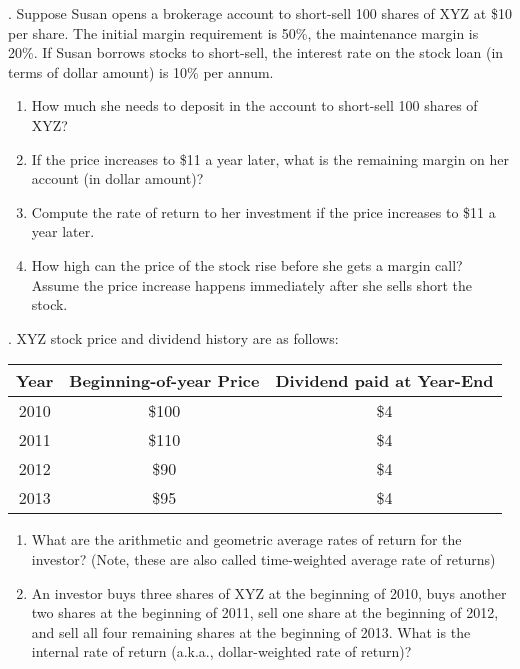\documentclass[11.5pt]{article}
\begin{document}
\newpage





. Suppose Susan opens a brokerage account to short-sell 100 shares of XYZ at \$10 per share.  The initial margin requirement is 50\%, the maintenance margin is 20\%.  If Susan borrows stocks to short-sell, the interest rate on the stock loan (in terms of dollar amount) is 10\% per annum.  


\begin{enumerate}
\item How much she needs to deposit in the account to short-sell 100 shares of XYZ?

\item If the price increases to \$11 a year later, what is the remaining margin on her account (in dollar amount)?

\item Compute the rate of return to her investment if the price increases to \$11 a year later.

\item How high can the price of the stock rise before she gets a margin call?  Assume the price increase happens immediately after she sells short the stock.

\end{enumerate}
	

\vspace{40pt}



. XYZ stock price and dividend history are as follows:

\begin{table}[h]
	\begin{tabular}{ccc}
		\hline
		Year & Beginning-of-year Price & Dividend paid at   Year-End \\ \hline
		2010 & \$100                   & \$4                         \\
		2011 & \$110                   & \$4                         \\
		2012 & \$90                    & \$4                         \\
		2013 & \$95                    & \$4                         \\ \hline
	\end{tabular}
\end{table}  


\begin{enumerate}[a]
	\item What are the arithmetic and geometric average rates of return for the investor? (Note, these are also called time-weighted average rate of returns)
	
	\item An investor buys three shares of XYZ at the beginning of 2010, buys another two shares at the beginning of 2011, sell one share at the beginning of 2012, and sell all four remaining shares at the beginning of 2013. What is the internal rate of return (a.k.a., dollar-weighted rate of return)? 
		
\end{enumerate}
\end{document}
